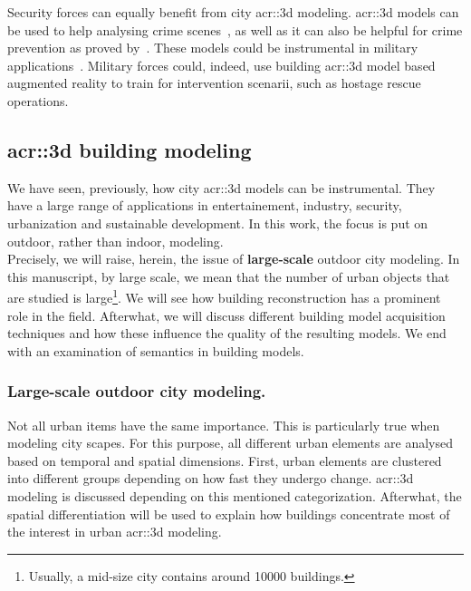             Security forces can equally benefit from city \gls{acr::3d} modeling.
            \gls{acr::3d} models can be used to help analysing crime scenes~\parencite{wolff2009towards}, as well as it can also be helpful for crime prevention as proved by~\textcite{wolff2008geospatial}.
            These models could be instrumental in military applications~\parencite{zlatanova2002trends, budroni2010automatic}.
            Military forces could, indeed, use building \gls{acr::3d} model based augmented reality to train for intervention scenarii, such as hostage rescue operations.

    \subsection{\texorpdfstring{\gls*{acr::3d}}{3D} building modeling}
        \label{subsec::introduction::urban_3d_reconstruction::building_3d_modeling}
        We have seen, previously, how city \gls{acr::3d} models can be instrumental.
        They have a large range of applications in entertainement, industry, security, urbanization and sustainable development.
        In this work, the focus is put on outdoor, rather than indoor, modeling.\\

        Precisely, we will raise, herein, the issue of \textbf{large-scale} outdoor city modeling.
        In this manuscript, by large scale, we mean that the number of urban objects that are studied is large\footnote{Usually, a mid-size city contains around \num{10000} buildings.}.
        We will see how building reconstruction has a prominent role in the field.
        Afterwhat, we will discuss different building model acquisition techniques and how these influence the quality of the resulting models.
        We end with an examination of semantics in building models.

        \subsubsection{Large-scale outdoor city modeling.}
            Not all urban items have the same importance.
            This is particularly true when modeling city scapes.
            For this purpose, all different urban elements are analysed based on temporal and spatial dimensions.
            First, urban elements are clustered into different groups depending on how fast they undergo change.
            \gls{acr::3d} modeling is discussed depending on this mentioned categorization.
            Afterwhat, the spatial differentiation will be used to explain how buildings concentrate most of the interest in urban \gls{acr::3d} modeling.\\

